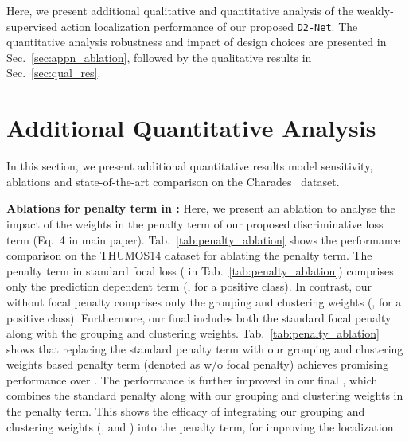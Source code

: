\documentclass[10pt,twocolumn,letterpaper]{article}
\def\proposed{\texttt{D2-Net}{}}
\begin{document}
\clearpage


\appendix

Here, we present additional qualitative and quantitative analysis of the weakly-supervised action localization performance of our proposed \proposed{}. The quantitative analysis \wrt robustness and impact of design choices are presented in Sec.~\ref{sec:appn_ablation}, followed by the qualitative results in Sec.~\ref{sec:qual_res}. 




\section{Additional Quantitative Analysis\label{sec:appn_ablation}}
In this section, we present additional quantitative results \wrt model sensitivity, ablations and state-of-the-art comparison on the Charades~\cite{charades} dataset.




\noindent\textbf{Ablations for penalty term in :} 
Here, we present an ablation to analyse the impact of the weights in the penalty term of our proposed discriminative loss term (Eq.~4 in main paper). Tab.~\ref{tab:penalty_ablation} shows the performance comparison on the THUMOS14 dataset for ablating the penalty term. The penalty term in standard focal loss ( in Tab.~\ref{tab:penalty_ablation}) comprises only the prediction dependent term (\eg,  for a positive class). In contrast, our  without focal penalty comprises only the grouping and clustering weights (\eg,  for a positive class). Furthermore, our final  includes both the standard focal penalty along with the grouping and clustering weights. Tab.~\ref{tab:penalty_ablation} shows that replacing the standard penalty term with our grouping and clustering weights based penalty term (denoted as  w/o focal penalty) achieves promising performance over . The performance is further improved in our final , which combines the standard penalty along with our grouping and clustering weights in the penalty term. This shows the efficacy of integrating our grouping and clustering weights (,  and ) into the penalty term, for improving the localization.
\end{document}
